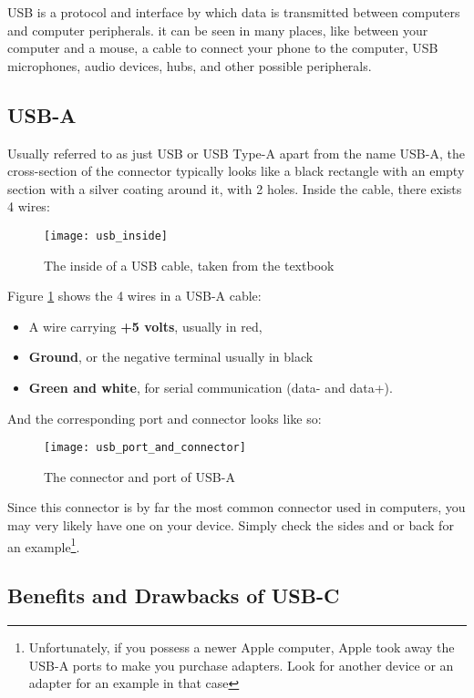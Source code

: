 \documentclass[../main.tex]{subfiles}
\begin{document}
USB is a protocol and interface by which data is transmitted between computers and computer peripherals. it can be seen in many places, like between your computer and a mouse, a cable to connect your phone to the computer, USB microphones, audio devices, hubs, and other possible peripherals.

\subsection{USB-A}

Usually referred to as just USB or USB Type-A apart from the name USB-A, the cross-section of the connector typically looks like a black rectangle with an empty section with a silver coating around it, with 2 holes. Inside the cable, there exists 4 wires:

\begin{figure}[h]
    \centering
    \texttt{[image: usb\_inside]}
    \caption{The inside of a USB cable, taken from the textbook}
    \label{fig:usb_inside}
\end{figure}

Figure \ref{fig:usb_inside} shows the 4 wires in a USB-A cable:

\begin{itemize}
    \item A wire carrying \textbf{+5 volts}, usually in red,
    \item \textbf{Ground}, or the negative terminal usually in black
    \item \textbf{Green and white}, for serial communication (data- and data+).
\end{itemize}

And the corresponding port and connector looks like so:

\begin{figure}[h]
    \centering
    \texttt{[image: usb\_port\_and\_connector]}
    \caption{The connector and port of USB-A}
    \label{fig:usba_port_and_connector}
\end{figure}

Since this connector is by far the most common connector used in computers, you may very likely have one on your device. Simply check the sides and or back
for an example\footnote{Unfortunately, if you possess a newer Apple computer, Apple took away the USB-A ports to make you purchase adapters. Look for another device or an adapter for an example in that case}.

\subsection{Benefits and Drawbacks of USB-C}
\end{document}
